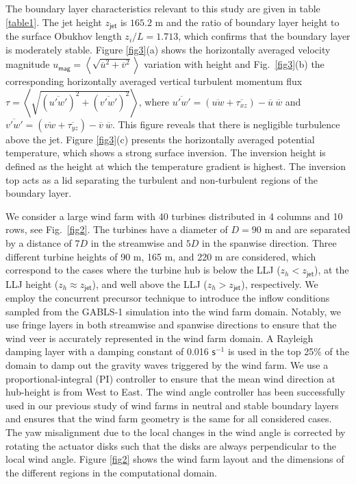 \documentclass[%
 aip,
 amsmath,amssymb,
preprint,%
author-numerical,%
]{revtex4-1}
\begin{document}
The boundary layer characteristics relevant to this study are given in table \ref{table1}. The jet height $z_\mathsf{jet}$ is $165.2$ m and the ratio of boundary layer height to the surface Obukhov length $z_i/L=1.713$, which confirms that the boundary layer is moderately stable. Figure \ref{fig3}(a) shows the horizontally averaged velocity magnitude $u_\mathsf{mag}=\left<\sqrt{\overline{u}^2+\overline{v}^2}\right>$ variation with height and Fig.\ \ref{fig3}(b) the corresponding horizontally averaged vertical turbulent momentum flux $\tau=\left<\sqrt{(\overline{u'w'})^2 + (\overline{v'w'})^2}\right>$, where $\overline{u'w'}=\left(\overline{{uw}} + \overline{\tau_{xz}}\right)-\overline{{u}}~\overline{{w}}$ and $\overline{v'w'}=\left(\overline{{vw}} + \overline{\tau_{yz}}\right)-\overline{{v}}~\overline{{w}}$. This figure reveals that there is negligible turbulence above the jet. Figure \ref{fig3}(c) presents the horizontally averaged potential temperature, which shows a strong surface inversion. The inversion height is defined as the height at which the temperature gradient is highest. The inversion top acts as a lid separating the turbulent and non-turbulent regions of the boundary layer.

We consider a large wind farm with 40 turbines distributed in 4 columns and 10 rows, see Fig.\ \ref{fig2}. The turbines have a diameter of $D=90$ m and are separated by a distance of $7D$ in the streamwise and $5D$ in the spanwise direction. Three different turbine heights of 90 m, 165 m, and 220 m are considered, which correspond to the cases where the turbine hub is below the LLJ ($z_h < z_\mathsf{jet}$), at the LLJ height ($z_h{\approx}z_\mathsf{jet}$), and well above the LLJ ($z_h > z_\mathsf{jet}$), respectively. We employ the concurrent precursor technique \cite{ste14} to introduce the inflow conditions sampled from the GABLS-1 simulation into the wind farm domain. Notably, we use fringe layers in both streamwise and spanwise directions to ensure that the wind veer is accurately represented in the wind farm domain.
A Rayleigh damping layer\cite{kle78} with a damping constant of 0.016 $\mathsf{s}^{-1}$ is used in the top 25$\%$ of the domain to damp out the gravity waves triggered by the wind farm. We use a proportional-integral (PI) controller\cite{all15} to ensure that the mean wind direction at hub-height is from West to East. The wind angle controller has been successfully used in our previous study of wind farms in neutral and stable boundary layers \cite{nag19} and ensures that the wind farm geometry is the same for all considered cases. The yaw misalignment due to the local changes in the wind angle is corrected by rotating the actuator disks such that the disks are always perpendicular to the local wind angle. Figure \ref{fig2} shows the wind farm layout and the dimensions of the different regions in the computational domain.
\end{document}
